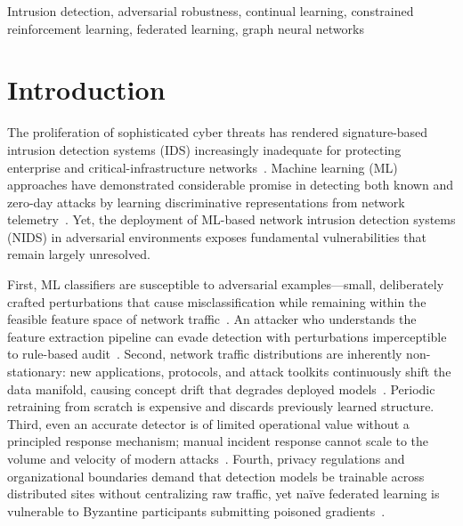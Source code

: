 \documentclass[journal,twoside]{IEEEtran}
\begin{document}
\begin{IEEEkeywords}
Intrusion detection, adversarial robustness, continual learning, constrained
reinforcement learning, federated learning, graph neural networks
\end{IEEEkeywords}

\section{Introduction}
\label{sec:introduction}

The proliferation of sophisticated cyber threats has rendered signature-based
intrusion detection systems (IDS) increasingly inadequate for protecting
enterprise and critical-infrastructure networks~\cite{khraisat2019survey}.
Machine learning (ML) approaches have demonstrated considerable promise in
detecting both known and zero-day attacks by learning discriminative
representations from network telemetry~\cite{buczak2016survey,
aldweesh2020deep}. Yet, the deployment of ML-based network intrusion detection
systems (NIDS) in adversarial environments exposes fundamental vulnerabilities
that remain largely unresolved.

First, ML classifiers are susceptible to adversarial examples---small,
deliberately crafted perturbations that cause misclassification while remaining
within the feasible feature space of network
traffic~\cite{goodfellow2015explaining, carlini2017towards}. An attacker who
understands the feature extraction pipeline can evade detection with
perturbations imperceptible to rule-based audit~\cite{hashemi2019towards}.
Second, network traffic distributions are inherently non-stationary: new
applications, protocols, and attack toolkits continuously shift the data
manifold, causing concept drift that degrades deployed
models~\cite{jordaney2017transcend}. Periodic retraining from scratch is
expensive and discards previously learned structure. Third, even an accurate
detector is of limited operational value without a principled response
mechanism; manual incident response cannot scale to the volume and velocity
of modern attacks~\cite{nguyen2021deep}. Fourth, privacy regulations and
organizational boundaries demand that detection models be trainable across
distributed sites without centralizing raw traffic, yet na\"ive federated
learning is vulnerable to Byzantine participants submitting poisoned
gradients~\cite{blanchard2017machine}.
\end{document}
